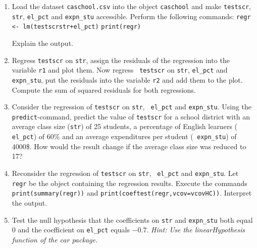 \documentclass{article}
\begin{document}
\begin{enumerate}
\item Load the dataset \texttt{caschool.csv} into the object \texttt{caschool} and
make \texttt{testscr}, \texttt{str}, \texttt{el\_pct} and \texttt{expn\_stu} accessible. Perform the following
commands:\smallskip \newline
\texttt{regr <- lm(testscrstr+el\_pct)}\newline
\texttt{print(regr)}

Explain the output.

\item Regress \texttt{testscr} on \texttt{str}, assign the residuals of the
regression into the variable \texttt{r1} and plot them. Now regress \texttt{%
testscr} on \texttt{str}, \texttt{el\_pct} and \texttt{expn\_stu}, put the
residuals into the variable \texttt{r2} and add them to the plot. Compute
the sum of squared residuals for both regressions.

\item Consider the regression of \texttt{testscr} on \texttt{str}, \texttt{%
el\_pct} and \texttt{expn\_stu}. Using the \texttt{predict}-command, predict
the value of \texttt{testscr} for a school district with an average class
size (\texttt{str}) of 25 students, a percentage of English learners (%
\texttt{el\_pct}) of 60\% and an average expenditures per student (\texttt{%
expn\_stu}) of 4000\$. How would the result change if the average class size
was reduced to 17?

\item Reconsider the regression of \texttt{testscr} on \texttt{str}, \texttt{%
el\_pct} and \texttt{expn\_stu}. Let \texttt{regr} be the object containing
the regression results. Execute the commands \texttt{print(summary(regr))}
and \texttt{print(coeftest(regr,vcov=vcovHC))}. Interpret the output.

\item Test the null hypothesis that the coefficients on \texttt{str} and
\texttt{expn\_stu} both equal $0$ and the coefficient on \texttt{el\_pct}
equals $-0.7$. \emph{Hint: Use the linearHypothesis function of the car package.}
\end{enumerate}
\end{document}
